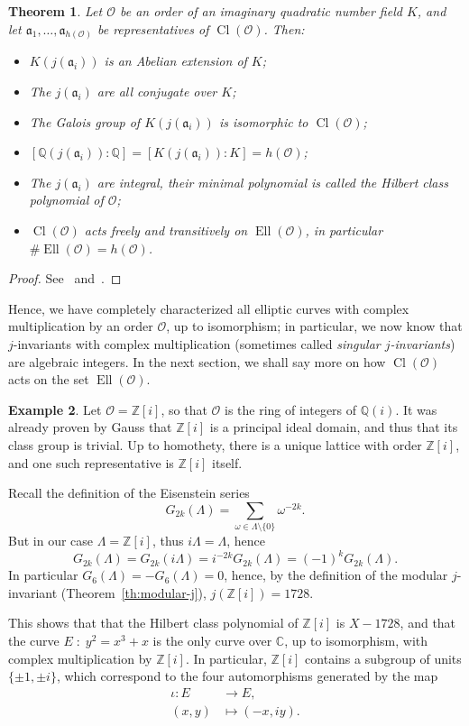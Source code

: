 \documentclass[10pt]{article}
\theoremstyle{plain}
\newtheorem{theorem}{Theorem}
\theoremstyle{definition}
\newtheorem{example}[theorem]{Example}
\DeclareMathOperator{\Cl}{Cl}
\DeclareMathOperator{\Ell}{Ell}
\def\O{\ensuremath{\mathcal{O}}}
\def\a{\ensuremath{\mathfrak{a}}}
\begin{document}
\begin{theorem}
  \label{th:compl-mult}
  Let $\O$ be an order of an imaginary quadratic
  number field $K$, and let
  $\a_1,\dots,\a_{h(\O)}$ be representatives of $\Cl(\O)$. %
  Then:
  \begin{itemize}
  \item $K(j(\a_i))$ is an Abelian extension of $K$;
  \item The $j(\a_i)$ are all conjugate over $K$;
  \item The Galois group of $K(j(\a_i))$ is isomorphic to $\Cl(\O)$;
  \item $[ℚ(j(\a_i)):ℚ] = [K(j(\a_i)):K] = h(\O)$;
  \item The $j(\a_i)$ are integral, their minimal polynomial is called
    the \emph{Hilbert class polynomial} of $\O$;
  \item $\Cl(\O)$ acts freely and transitively on $\Ell(\O)$, in
    particular $\#\Ell(\O) = h(\O)$.
  \end{itemize}
\end{theorem}
\begin{proof}
  See~\cite[Ch.~II]{silverman:advanced} and~\cite[Ch.~10]{lang1987elliptic}.
\end{proof}

Hence, we have completely characterized all elliptic curves with
complex multiplication by an order $\O$, up to isomorphism; in
particular, we now know that $j$-invariants with complex
multiplication (sometimes called \emph{singular $j$-invariants}) are
algebraic integers. %
In the next section, we shall say more on how $\Cl(\O)$ acts on the set
$\Ell(\O)$.

\begin{example}
  Let $\O=ℤ[i]$, so that $\O$ is the ring of integers of $ℚ(i)$. %
  It was already proven by Gauss that $ℤ[i]$ is a principal ideal
  domain, and thus that its class group is trivial. %
  Up to homothety, there is a unique lattice with order $ℤ[i]$, and
  one such representative is $ℤ[i]$ itself.

  Recall the definition of the Eisenstein series
  \[G_{2k}(Λ) = \sum_{ω∈Λ\setminus\{0\}} ω^{-2k}.\]
  But in our case $Λ=ℤ[i]$, thus $iΛ=Λ$, hence
  \[G_{2k}(Λ) = G_{2k}(iΛ) = i^{-2k}G_{2k}(Λ) = (-1)^kG_{2k}(Λ).\] In
  particular $G_6(Λ) = - G_6(Λ) = 0$, hence, by the definition of the
  modular $j$-invariant (Theorem~\ref{th:modular-j}),
  $j(ℤ[i]) = 1728$.

  This shows that that the Hilbert class polynomial of $ℤ[i]$ is
  $X-1728$, and that the curve $E\;:\;y^2=x^3+x$ is the only curve
  over $ℂ$, up to isomorphism, with complex multiplication by
  $ℤ[i]$. %
  In particular, $ℤ[i]$ contains a subgroup of units $\{±1,±i\}$,
  which correspond to the four automorphisms generated by the map
  \begin{align*}
    ι : E &→ E,\\
    (x,y) &↦ (-x,iy).
  \end{align*}
\end{example}
\end{document}
